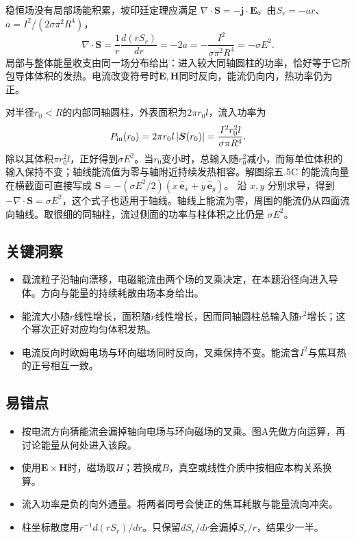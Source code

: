 \documentclass[UTF8,fontset=fandol,a4paper,11pt]{ctexart}
\begin{document}
稳恒场没有局部场能积累，坡印廷定理应满足
$\nabla\cdot\boldsymbol S=-\boldsymbol j\cdot\boldsymbol E$。由$S_r=-ar$、
$a=I^2/(2\sigma\pi^2R^4)$，
\[
\nabla\cdot\boldsymbol S
=\frac1r\frac{d(rS_r)}{dr}
=-2a=-\frac{I^2}{\sigma\pi^2R^4}
=-\sigma E^2.
\]
局部与整体能量收支由同一场分布给出：进入较大同轴圆柱的功率，恰好等于它所包导体体积的发热。电流改变符号时$\boldsymbol E,\boldsymbol H$同时反向，能流仍向内，热功率仍为正。

对半径$r_0<R$的内部同轴圆柱，外表面积为$2\pi r_0l$，流入功率为
\[
P_{\rm in}(r_0)=2\pi r_0l\,|\boldsymbol S(r_0)|
=\frac{I^2r_0^2l}{\sigma\pi R^4}.
\]
除以其体积$\pi r_0^2l$，正好得到$\sigma E^2$。当$r_0$变小时，总输入随$r_0^2$减小，而每单位体积的输入保持不变；轴线能流值为零与轴附近持续发热相容。解图综五.5C 的能流向量在横截面可直接写成
$\boldsymbol S=-(\sigma E^2/2)(x\,\hat{\boldsymbol e}_x+y\,\hat{\boldsymbol e}_y)$。
沿 $x,y$ 分别求导，得到 $-\nabla\cdot\boldsymbol S=\sigma E^2$，这个式子也适用于轴线。轴线上能流为零，周围的能流仍从四面流向轴线。取很细的同轴柱，流过侧面的功率与柱体积之比仍是 $\sigma E^2$。




\subsection*{关键洞察}

\begin{itemize}
\item 载流粒子沿轴向漂移，电磁能流由两个场的叉乘决定，在本题沿径向进入导体。方向与能量的持续耗散由场本身给出。
\item 能流大小随$r$线性增长，面积随$r$线性增长，因而同轴圆柱总输入随$r^2$增长；这个幂次正好对应均匀体积发热。
\item 电流反向时欧姆电场与环向磁场同时反向，叉乘保持不变。能流含$I^2$与焦耳热的正号相互一致。
\end{itemize}



\subsection*{易错点}

\begin{itemize}
\item 按电流方向猜能流会漏掉轴向电场与环向磁场的叉乘。图A先做方向运算，再讨论能量从何处进入该段。
\item 使用$\boldsymbol E\times\boldsymbol H$时，磁场取$H$；若换成$B$，真空或线性介质中按相应本构关系换算。
\item 流入功率是负的向外通量。将两者同号会使正的焦耳耗散与能量流向冲突。
\item 柱坐标散度用$r^{-1}d(rS_r)/dr$。只保留$dS_r/dr$会漏掉$S_r/r$，结果少一半。
\end{itemize}
\end{document}
